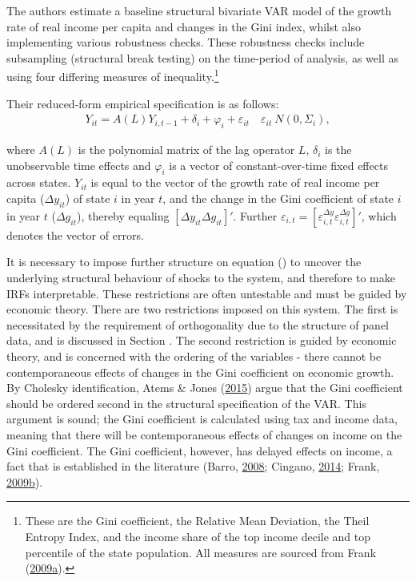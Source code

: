\documentclass[11pt,preprint, authoryear]{elsarticle}
\numberwithin{equation}{section}
\numberwithin{figure}{section}
\numberwithin{table}{section}
\let\rmarkdownfootnote\footnote%
\def\footnote{\protect\rmarkdownfootnote}
\begin{document}
The authors estimate a baseline structural bivariate VAR model of the
growth rate of real income per capita and changes in the Gini index,
whilst also implementing various robustness checks. These robustness
checks include subsampling (structural break testing) on the time-period
of analysis, as well as using four differing measures of
inequality.\footnote{These are the Gini coefficient, the Relative Mean
  Deviation, the Theil Entropy Index, and the income share of the top
  income decile and top percentile of the state population. All measures
  are sourced from Frank
  (\protect\hyperlink{ref-frank}{2009}\protect\hyperlink{ref-frank}{a}).}

Their reduced-form empirical specification is as follows:
\begin{align}\tag{1}
Y_{it} = A(L)Y_{i,t-1} + \delta_i + \varphi_i + \varepsilon_{it} \hspace{12pt} \varepsilon_{it} ~ N(0, \Sigma_{i}), \label{eq1}
\end{align}

where \(A(L)\) is the polynomial matrix of the lag operator \(L\),
\(\delta_i\) is the unobservable time effects and \(\varphi_i\) is a
vector of constant-over-time fixed effects across states. \(Y_{it}\) is
equal to the vector of the growth rate of real income per capita
(\(\Delta y_{it}\)) of state \(i\) in year \(t\), and the change in the
Gini coefficient of state \(i\) in year \(t\) (\(\Delta g_{it}\)),
thereby equaling \([\Delta y_{it} \Delta g_{it} ]'\). Further
\(\varepsilon_{i,t} = [\varepsilon_{i,t}^{\Delta y} \varepsilon_{i,t}^{\Delta g}]'\),
which denotes the vector of errors.

It is necessary to impose further structure on equation () to
uncover the underlying structural behaviour of shocks to the system, and
therefore to make IRFs interpretable. These restrictions are often
untestable and must be guided by economic theory. There are two
restrictions imposed on this system. The first is necessitated by the
requirement of orthogonality due to the structure of panel data, and is
discussed in Section . The second restriction is guided
by economic theory, and is concerned with the ordering of the variables
- there cannot be contemporaneous effects of changes in the Gini
coefficient on economic growth. By Cholesky identification, Atems \&
Jones (\protect\hyperlink{ref-atems}{2015}) argue that the Gini
coefficient should be ordered second in the structural specification of
the VAR. This argument is sound; the Gini coefficient is calculated
using tax and income data, meaning that there will be contemporaneous
effects of changes on income on the Gini coefficient. The Gini
coefficient, however, has delayed effects on income, a fact that is
established in the literature (Barro,
\protect\hyperlink{ref-barro}{2008}; Cingano,
\protect\hyperlink{ref-cingano}{2014}; Frank,
\protect\hyperlink{ref-frankincome}{2009}\protect\hyperlink{ref-frankincome}{b}).
\end{document}
